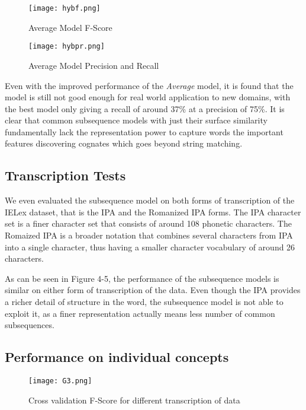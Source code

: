 \begin{figure}[ht]
\centering
\texttt{[image: hybf.png]}
\caption{Average Model F-Score}
\end{figure}

\begin{figure}[ht]
\centering
\texttt{[image: hybpr.png]}
\caption{Average Model Precision and Recall}
\end{figure}

Even with the improved performance of the \textit{Average} model, it is found that the model is still not good enough for real world application to new domains, with the best model only giving a recall of around 37\% at a precision of 75\%. It is clear that common subsequence models with just their surface similarity fundamentally lack the representation power to capture words the important features discovering cognates which goes beyond string matching.

\subsection{Transcription Tests}

We even evaluated the subsequence model on both forms of transcription of the IELex dataset, that is the IPA and the Romanized IPA forms. The IPA character set is a finer character set that consists of around 108 phonetic characters. The Romaized IPA is a broader notation that combines several characters from IPA into a single character, thus having a smaller character vocabulary of around 26 characters. 

As can be seen in Figure 4-5, the performance of the subsequence models is similar on either form of transcription of the data. Even though the IPA provides a richer detail of structure in the word, the subsequence model is not able to exploit it, as a finer representation actually means less number of common subsequences. 

\clearpage
\subsection{Performance on individual concepts}

\begin{figure}[t]
\centering
\texttt{[image: G3.png]}
\caption{Cross validation F-Score for different transcription of data}
\end{figure}

